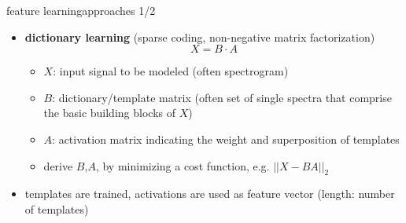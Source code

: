         \begin{frame}{feature learning}{approaches 1/2}
            \begin{itemize}
                \item   \textbf{dictionary learning} (sparse coding, non-negative matrix factorization)
                    \begin{equation*}
                        X = B\cdot A
                    \end{equation*}
                    \begin{itemize}
                        \item[]   $X$: input signal to be modeled (often spectrogram)
                        \item[]   $B$: dictionary/template matrix (often set of single spectra that comprise the basic building blocks of $X$)
                        \item[]   $A$: activation matrix indicating the weight and superposition of templates 
                    \end{itemize}
                    \begin{itemize}
                        \item   derive $B$,$A$, by minimizing a cost function, e.g. $||X-BA||_2$
                    \end{itemize}
                \item<2->[$\rightarrow$] templates are trained, activations are used as feature vector (length: number of templates)
            \end{itemize}
		\end{frame}
